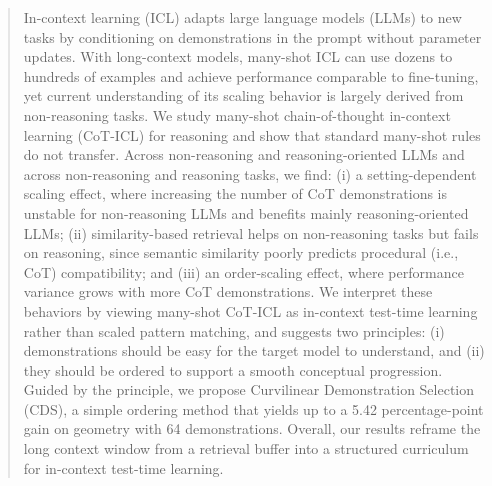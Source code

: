 \documentclass{article}
\theoremstyle{plain}
\theoremstyle{definition}
\theoremstyle{remark}
\begin{document}



\printAffiliationsAndNotice{}  %

\begin{abstract}
In-context learning (ICL) adapts large language models (LLMs) to new tasks by conditioning on demonstrations in the prompt without parameter updates. With long-context models, many-shot ICL can use dozens to hundreds of examples and achieve performance comparable to fine-tuning, yet current understanding of its scaling behavior is largely derived from non-reasoning tasks. We study many-shot chain-of-thought in-context learning (CoT-ICL) for reasoning and show that standard many-shot rules do not transfer. Across non-reasoning and reasoning-oriented LLMs and across non-reasoning and reasoning tasks, we find: (i) a setting-dependent scaling effect, where increasing the number of CoT demonstrations is unstable for non-reasoning LLMs and benefits mainly reasoning-oriented LLMs; (ii) similarity-based retrieval helps on non-reasoning tasks but fails on reasoning, since semantic similarity poorly predicts procedural (i.e., CoT) compatibility; and (iii) an order-scaling effect, where performance variance grows with more CoT demonstrations. We interpret these behaviors by viewing many-shot CoT-ICL as in-context test-time learning rather than scaled pattern matching, and suggests two principles: (i) demonstrations should be easy for the target model to understand, and (ii) they should be ordered to support a smooth conceptual progression. Guided by the principle, we propose Curvilinear Demonstration Selection (CDS), a simple ordering method that yields up to a 5.42 percentage-point gain on geometry with 64 demonstrations. Overall, our results reframe the long context window from a retrieval buffer into a structured curriculum for in-context test-time learning.
\end{abstract}
\end{document}
